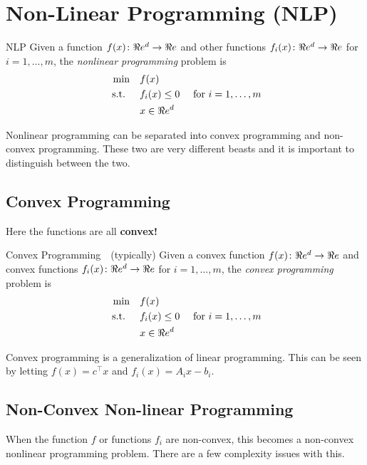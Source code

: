 \section{Non-Linear Programming (NLP)}
\begin{general}{NLP}{\nphard}
Given a function $f(x)\colon \Re e^d \to \Re e$ and other functions $f_i(x)\colon \Re e^d \to \Re e$ for $i=1, \dots, m$,  the \emph{nonlinear programming} problem is
\begin{equation}
\label{eq:convex-programming}
\begin{split}
\min \quad & f(x)\\
\mbox{ s.t. }  \quad & f_i(x) \leq 0  \quad  \mbox{ for } i=1, \dots, m\\
& x \in \Re e^d
\end{split}
\end{equation}
\end{general}


Nonlinear programming can be separated into convex programming and non-convex programming.  These two are very different beasts and it is important to distinguish between the two.
\subsection{Convex Programming}
Here the functions are all \textbf{convex!}
\begin{general}{Convex Programming}{\polynomial\ \  (typically)}
Given a convex function $f(x)\colon \Re e^d \to \Re e$ and convex functions $f_i(x)\colon \Re e^d \to \Re e$ for $i=1, \dots, m$,  the \emph{convex programming} problem is
\begin{equation}
\label{eq:convex-programming}
\begin{split}
\min \quad & f(x)\\
\mbox{ s.t. }  \quad & f_i(x) \leq 0  \quad  \mbox{ for } i=1, \dots, m\\
& x \in \Re e^d
\end{split}
\end{equation}
\end{general}
\begin{example}{}{}
Convex programming is a generalization of linear programming.  This can be seen by letting $f(x) = c^\top x$ and $f_i(x) = A_i x - b_i$.  
\end{example}
\subsection{Non-Convex Non-linear Programming}
When the function $f$ or functions $f_i$ are non-convex, this becomes a non-convex nonlinear programming problem.  There are a few complexity issues with this.


